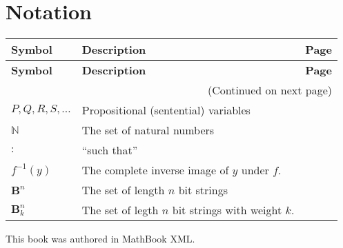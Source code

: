 \documentclass[10pt,]{book}
\theoremstyle{plain}
\theoremstyle{definition}
\theoremstyle{definition}
\theoremstyle{definition}
\numberwithin{equation}{section}
\def\N{\mathbb N}
\def\B{\mathbf{B}}
\def\inv{^{-1}}
\def\st{:}
\begin{document}
\chapter[Notation]{Notation}\label{appendix-2}
\begin{longtable}[l]{llr}
\textbf{Symbol}&\textbf{Description}&\textbf{Page}\\[1em]
\endfirsthead
\textbf{Symbol}&\textbf{Description}&\textbf{Page}\\[1em]
\endhead
\multicolumn{3}{r}{(Continued on next page)}\\
\endfoot
\endlastfoot
$
                    P, Q, R, S, \ldots
                $&Propositional (sentential) variables&\pageref{notation-1}\\
$\N$&The set of natural numbers&\pageref{notation-2}\\
$\st$&``such that''&\pageref{notation-3}\\
$f\inv(y)$&The complete inverse image of \(y\) under \(f\).&\pageref{notation-4}\\
$\B^n$&The set of length \(n\) bit strings&\pageref{notation-5}\\
$\B^n_k$&The set of legth \(n\) bit strings with weight \(k\).&\pageref{notation-6}\\
\end{longtable}
%
\backmatter
%
%
\printindex
%
\cleardoublepage
\pagestyle{empty}
\centerline{
    This book was authored in MathBook XML.
}
\end{document}
